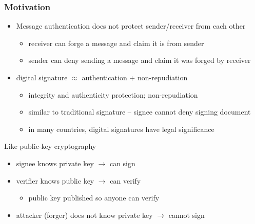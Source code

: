 \documentclass[final]{article}
\begin{document}
\subsubsection*{Motivation}
\begin{itemize}[nosep]
    \item Message authentication does not protect sender/receiver from each other
          \begin{itemize}[nosep]
              \item receiver can forge a message and claim it is from sender
              \item sender can deny sending a message and claim it was forged by receiver
          \end{itemize}
    \item digital signature $\approx$ authentication + non-repudiation
          \begin{itemize}[nosep]
              \item integrity and authenticity protection; non-repudiation
              \item similar to traditional signature -- signee cannot deny signing document
              \item in many countries, digital signatures have legal significance
          \end{itemize}
\end{itemize}
Like public-key cryptography
\begin{itemize}[nosep]
    \item signee knows private key $\rightarrow$ can sign
    \item verifier knows public key $\rightarrow$ can verify
          \begin{itemize}[nosep]\item public key published so anyone can verify\end{itemize}
    \item attacker (forger) does not know private key $\rightarrow$ cannot sign
\end{itemize}
\end{document}
